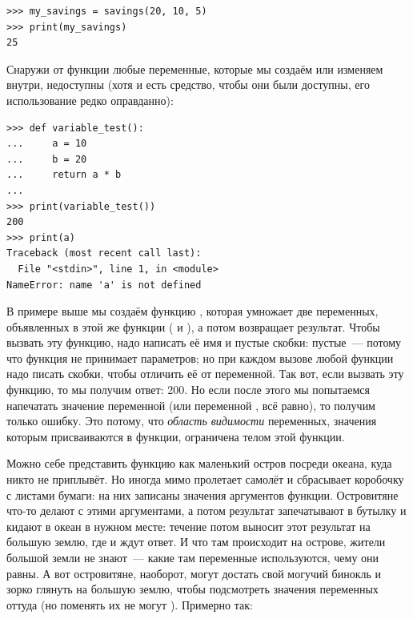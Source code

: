 \begin{listing}
\begin{verbatim}
>>> my_savings = savings(20, 10, 5)
>>> print(my_savings)
25
\end{verbatim}
\end{listing}

Снаружи от функции любые переменные, которые мы создаём или изменяем внутри, недоступны (хотя и есть средство, чтобы они были доступны, его использование редко оправданно):

\begin{listing}
\begin{verbatim}
>>> def variable_test():
...     a = 10
...     b = 20
...     return a * b
...
>>> print(variable_test())
200
>>> print(a)
Traceback (most recent call last):
  File "<stdin>", line 1, in <module>
NameError: name 'a' is not defined
\end{verbatim}
\end{listing} 

В примере выше мы создаём функцию , которая умножает две переменных, объявленных в этой же функции ( и ), а потом возвращает результат. Чтобы вызвать эту функцию, надо написать её имя и пустые скобки: пустые — потому что функция не принимает параметров; но при каждом вызове любой функции надо писать скобки, чтобы отличить её от переменной. Так вот, если вызвать эту функцию, то мы получим ответ: 200. Но если после этого мы попытаемся напечатать значение переменной  (или переменной , всё равно), то получим только ошибку. Это потому, что \emph{область видимости} переменных, значения которым присваиваются в функции, ограничена телом этой функции.

Можно себе представить функцию как маленький остров посреди океана, куда никто не приплывёт. Но иногда мимо пролетает самолёт и сбрасывает коробочку с листами бумаги: на них записаны значения аргументов функции. Островитяне что-то делают с этими аргументами, а потом результат запечатывают в бутылку и кидают в океан в нужном месте: течение потом выносит этот результат на большую землю, где и ждут ответ. И что там происходит на острове, жители большой земли не знают — какие там переменные используются, чему они равны. А вот островитяне, наоборот, могут достать свой могучий бинокль и зорко глянуть на большую землю, чтобы подсмотреть значения переменных оттуда (но поменять их не могут %
). Примерно так:

